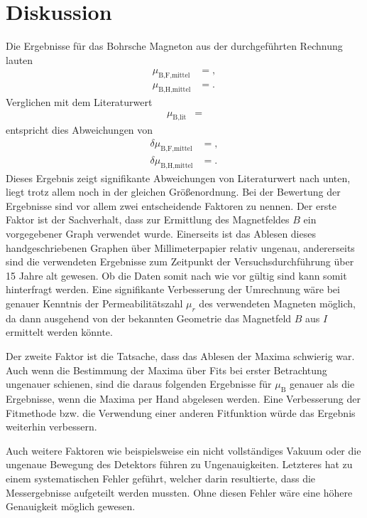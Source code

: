 \section{Diskussion}
\label{sec:Diskussion}

Die Ergebnisse für das Bohrsche Magneton aus der durchgeführten Rechnung lauten
\begin{align*}
  \mu_{\text{B,F,mittel}} &= ,\\
  \mu_{\text{B,H,mittel}} &= .
\end{align*}
Verglichen mit dem Literaturwert \cite{Konstanten}
\begin{align*}
  \mu_{\text{B,lit}} &= 
\end{align*}
entspricht dies Abweichungen von
\begin{align*}
  \delta \mu_{\text{B,F,mittel}} &= ,\\
  \delta \mu_{\text{B,H,mittel}} &= .
\end{align*}
Dieses Ergebnis zeigt signifikante Abweichungen von Literaturwert nach unten, liegt trotz allem noch in der gleichen Größenordnung.
Bei der Bewertung der Ergebnisse sind vor allem zwei entscheidende Faktoren zu nennen.
Der erste Faktor ist der Sachverhalt, dass zur Ermittlung des Magnetfeldes $B$ ein vorgegebener Graph verwendet wurde.
Einerseits ist das Ablesen dieses handgeschriebenen Graphen über Millimeterpapier relativ ungenau, andererseits sind die verwendeten Ergebnisse zum Zeitpunkt der Versuchsdurchführung über 15 Jahre alt gewesen.
Ob die Daten somit nach wie vor gültig sind kann somit hinterfragt werden.
Eine signifikante Verbesserung der Umrechnung wäre bei genauer Kenntnis der Permeabilitätszahl $\mu_r$ des verwendeten Magneten möglich, da dann ausgehend von der bekannten Geometrie das Magnetfeld $B$ aus $I$ ermittelt werden könnte.

Der zweite Faktor ist die Tatsache, dass das Ablesen der Maxima schwierig war.
Auch wenn die Bestimmung der Maxima über Fits bei erster Betrachtung ungenauer schienen, sind die daraus folgenden Ergebnisse für $\mu_\text{B}$ genauer als die Ergebnisse, wenn die Maxima per Hand abgelesen werden.
Eine Verbesserung der Fitmethode bzw. die Verwendung einer anderen Fitfunktion würde das Ergebnis weiterhin verbessern.

Auch weitere Faktoren wie beispielsweise ein nicht vollständiges Vakuum oder die ungenaue Bewegung des Detektors führen zu Ungenauigkeiten.
Letzteres hat zu einem systematischen Fehler geführt, welcher darin resultierte, dass die Messergebnisse aufgeteilt werden mussten.
Ohne diesen Fehler wäre eine höhere Genauigkeit möglich gewesen.
